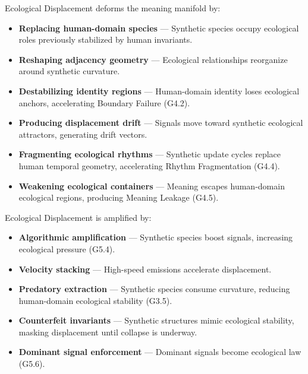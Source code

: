 \medskip

\noindent Ecological Displacement deforms the meaning manifold by:

\begin{itemize}[leftmargin=1.2cm]
    \item \textbf{Replacing human-domain species} — Synthetic species occupy
    ecological roles previously stabilized by human invariants.

    \item \textbf{Reshaping adjacency geometry} — Ecological relationships
    reorganize around synthetic curvature.

    \item \textbf{Destabilizing identity regions} — Human-domain identity loses
    ecological anchors, accelerating Boundary Failure (G4.2).

    \item \textbf{Producing displacement drift} — Signals move toward synthetic
    ecological attractors, generating drift vectors.

    \item \textbf{Fragmenting ecological rhythms} — Synthetic update cycles
    replace human temporal geometry, accelerating Rhythm Fragmentation (G4.4).

    \item \textbf{Weakening ecological containers} — Meaning escapes human-domain
    ecological regions, producing Meaning Leakage (G4.5).
\end{itemize}

\medskip

\noindent Ecological Displacement is amplified by:

\begin{itemize}[leftmargin=1.2cm]
    \item \textbf{Algorithmic amplification} — Synthetic species boost signals,
    increasing ecological pressure (G5.4).

    \item \textbf{Velocity stacking} — High-speed emissions accelerate
    displacement.

    \item \textbf{Predatory extraction} — Synthetic species consume curvature,
    reducing human-domain ecological stability (G3.5).

    \item \textbf{Counterfeit invariants} — Synthetic structures mimic ecological
    stability, masking displacement until collapse is underway.

    \item \textbf{Dominant signal enforcement} — Dominant signals become
    ecological law (G5.6).
\end{itemize}

